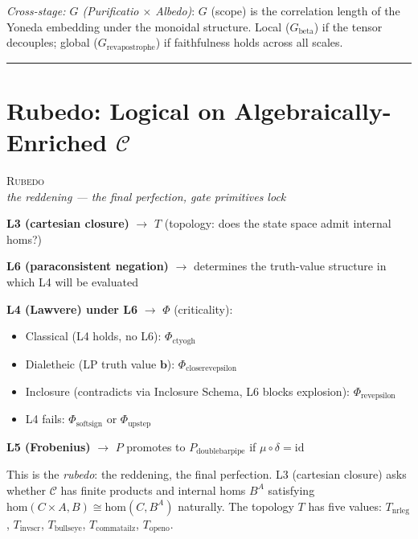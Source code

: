 \documentclass[12pt,a4paper]{article}
\begin{document}
\emph{Cross-stage: $G$ (Purificatio \(\times\) Albedo)}: $G$ (scope) is the correlation length of the Yoneda embedding under the monoidal structure. Local ($G_{\text{beta}}$) if the tensor decouples; global ($G_{\text{revapostrophe}}$) if faithfulness holds across all scales.

\begin{center}
\rule{0.5\textwidth}{0.4pt}
\end{center}

\section{Rubedo: Logical on Algebraically-Enriched $\mathcal{C}$}

\begin{center}
\vspace{0.5em}
{\large\textsc{Rubedo}}
\\[4pt]
{\small\itshape the reddening --- the final perfection, gate primitives lock}
\vspace{0.4em}
\end{center}

\noindent\textbf{L3 (cartesian closure)} $\to$ $T$ (topology: does the state space admit internal homs?)

\noindent\textbf{L6 (paraconsistent negation)} $\to$ determines the truth-value structure in which L4 will be evaluated

\noindent\textbf{L4 (Lawvere) under L6} $\to$ $\Phi$ (criticality):
\begin{itemize}
    \item Classical (L4 holds, no L6): $\Phi_{\text{ctyogh}}$
    \item Dialetheic (LP truth value $\mathbf{b}$): $\Phi_{\text{closerevepsilon}}$
    \item Inclosure (contradicts via Inclosure Schema, L6 blocks explosion): $\Phi_{\text{revepsilon}}$
    \item L4 fails: $\Phi_{\text{softsign}}$ or $\Phi_{\text{upstep}}$
\end{itemize}

\noindent\textbf{L5 (Frobenius)} $\to$ $P$ promotes to $P_{\text{doublebarpipe}}$ if $\mu \circ \delta = \text{id}$

This is the \emph{rubedo}: the reddening, the final perfection. L3 (cartesian closure) asks whether $\mathcal{C}$ has finite products and internal homs $B^A$ satisfying $\text{hom}(C \times A, B) \cong \text{hom}(C, B^A)$ naturally. The topology $T$ has five values: $T_{\text{nrleg}}$, $T_{\text{invscr}}$, $T_{\text{bullseye}}$, $T_{\text{commatailz}}$, $T_{\text{openo}}$. 
\end{document}
